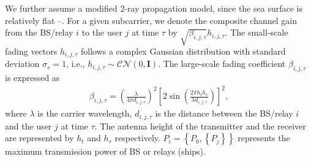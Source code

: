 \documentclass[conference]{IEEEtran}
\begin{document}
We further assume a modified 2-ray propagation model, since the sea surface is relatively flat \cite{p0}--\cite{p2}. For a given subcarrier, we denote the composite channel gain from the BS/relay $i$ to the user $j$ at time $\tau $ by $\sqrt {{\beta _{i,j,\tau }}} {h_{i,j,\tau }}$. The small-scale fading vectors ${h_{i,j,\tau }}$ follows a complex Gaussian distribution with standard deviation ${\sigma _s} = 1$, i.e., ${h_{i,j,\tau }} \sim \mathcal{CN}(0, \mathbf{I})$. The large-scale fading coefficient ${\beta _{i,j,\tau }}$ is expressed as
\begin{align}
{\beta _{i,j,\tau }} = {\left( {\frac{\lambda }{{4\pi {d_{i,j,\tau }}}}} \right)^2}{\left[ {2\sin \left( {\frac{{2\pi {h_t}{h_r}}}{{\lambda {d_{i,j,\tau }}}}} \right)} \right]^2} ,
\end{align}
where $\lambda $ is the carrier wavelength, ${d_{i,j,\tau }}$ is the distance between the BS/relay $i$ and the user $j$ at time $\tau $. The antenna height of the transmitter and the receiver are represented by $h_t$ and $h_r$ respectively. $P_i = \left\{ {P_0,\left\{ {P_j} \right\}} \right\}$ represents the maximum transmission power of BS or relays (ships). 
\end{document}
